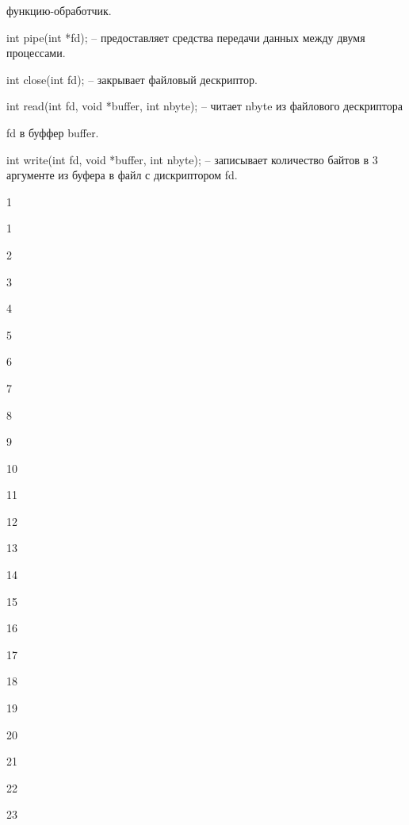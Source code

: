 \documentclass[a4paper,portrait,12pt]{article}
\begin{document}
\begin{flushleft}
функцию-обработчик.
\end{flushleft}


\begin{flushleft}
int pipe(int *fd); -- предоставляет средства передачи данных между двумя процессами.
\end{flushleft}


\begin{flushleft}
int close(int fd); -- закрывает файловый дескриптор.
\end{flushleft}


\begin{flushleft}
int read(int fd, void *buffer, int nbyte); -- читает nbyte из файлового дескриптора
\end{flushleft}


\begin{flushleft}
fd в буффер buffer.
\end{flushleft}


\begin{flushleft}
int write(int fd, void *buffer, int nbyte); -- записывает количество байтов в 3 аргументе из буфера в файл с дискриптором fd.
\end{flushleft}





1







1


2


3


4


5


6


7


8


9


10


11


12


13


14


15


16


17


18


19


20


21


22


23
\end{document}
